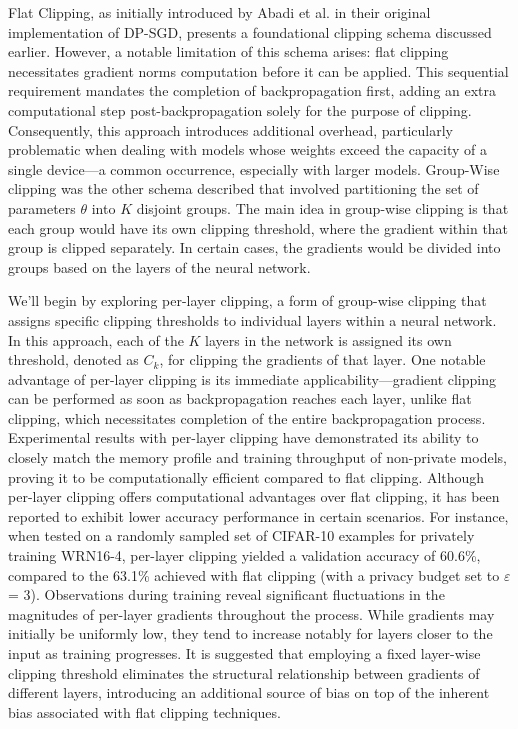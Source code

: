 \documentclass[11pt]{article}
\begin{document}
Flat Clipping, as initially introduced by Abadi et al. in their original implementation of DP-SGD, presents a foundational clipping schema discussed earlier. However, a notable limitation of this schema arises: flat clipping necessitates gradient norms computation before it can be applied. This sequential requirement mandates the completion of backpropagation first, adding an extra computational step post-backpropagation solely for the purpose of clipping. Consequently, this approach introduces additional overhead, particularly problematic when dealing with models whose weights exceed the capacity of a single device—a common occurrence, especially with larger models.
Group-Wise clipping was the other schema described that involved partitioning the set of parameters $\theta$ into $K$ disjoint groups. The main idea in group-wise clipping is that each group would have its own clipping threshold, where the gradient within that group is clipped separately. In certain cases, the gradients would be divided into groups based on the layers of the neural network.

We'll begin by exploring per-layer clipping, a form of group-wise clipping that assigns specific clipping thresholds to individual layers within a neural network. In this approach, each of the $K$ layers in the network is assigned its own threshold, denoted as $C_k$, for clipping the gradients of that layer. One notable advantage of per-layer clipping is its immediate applicability—gradient clipping can be performed as soon as backpropagation reaches each layer, unlike flat clipping, which necessitates completion of the entire backpropagation process. Experimental results with per-layer clipping have demonstrated its ability to closely match the memory profile and training throughput of non-private models, proving it to be computationally efficient compared to flat clipping.
Although per-layer clipping offers computational advantages over flat clipping, it has been reported to exhibit lower accuracy performance in certain scenarios. For instance, when tested on a randomly sampled set of CIFAR-10 examples for privately training WRN16-4, per-layer clipping yielded a validation accuracy of 60.6\%, compared to the 63.1\% achieved with flat clipping (with a privacy budget set to $\varepsilon$ = 3). Observations during training reveal significant fluctuations in the magnitudes of per-layer gradients throughout the process. While gradients may initially be uniformly low, they tend to increase notably for layers closer to the input as training progresses. It is suggested that employing a fixed layer-wise clipping threshold eliminates the structural relationship between gradients of different layers, introducing an additional source of bias on top of the inherent bias associated with flat clipping techniques.
\end{document}
